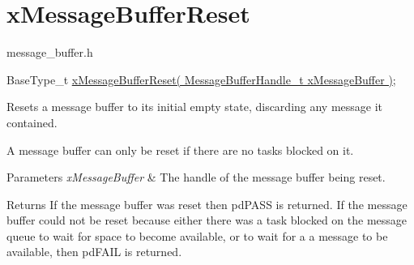 \hypertarget{group__xMessageBufferReset}{}\section{x\+Message\+Buffer\+Reset}
\label{group__xMessageBufferReset}
message\+\_\+buffer.\+h 
\begin{DoxyPre}
BaseType\_t \hyperlink{message__buffer_8h_a6d22ac0fd0463b202f2e22674380a41c}{xMessageBufferReset( MessageBufferHandle\_t xMessageBuffer )};
\end{DoxyPre}


Resets a message buffer to its initial empty state, discarding any message it contained.

A message buffer can only be reset if there are no tasks blocked on it.


\begin{DoxyParams}{Parameters}
{\em x\+Message\+Buffer} & The handle of the message buffer being reset.\\
\hline
\end{DoxyParams}
\begin{DoxyReturn}{Returns}
If the message buffer was reset then pd\+P\+A\+SS is returned. If the message buffer could not be reset because either there was a task blocked on the message queue to wait for space to become available, or to wait for a a message to be available, then pd\+F\+A\+IL is returned. 
\end{DoxyReturn}
